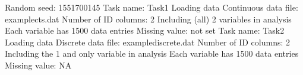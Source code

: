 \documentclass[letterpaper,10pt,english]{sphinxmanual}
\begin{document}
\begin{sphinxVerbatim}[commandchars=\\\{\}]
Random seed: 1551700145
\PYGZhy{}\PYGZhy{}\PYGZhy{}\PYGZhy{}\PYGZhy{}\PYGZhy{}\PYGZhy{}\PYGZhy{}\PYGZhy{}\PYGZhy{}\PYGZhy{}\PYGZhy{}\PYGZhy{}\PYGZhy{}\PYGZhy{}\PYGZhy{}\PYGZhy{}\PYGZhy{}\PYGZhy{}\PYGZhy{}\PYGZhy{}\PYGZhy{}\PYGZhy{}\PYGZhy{}\PYGZhy{}\PYGZhy{}\PYGZhy{}\PYGZhy{}\PYGZhy{}\PYGZhy{}\PYGZhy{}\PYGZhy{}\PYGZhy{}\PYGZhy{}\PYGZhy{}\PYGZhy{}\PYGZhy{}\PYGZhy{}\PYGZhy{}\PYGZhy{}\PYGZhy{}\PYGZhy{}\PYGZhy{}\PYGZhy{}\PYGZhy{}\PYGZhy{}\PYGZhy{}\PYGZhy{}\PYGZhy{}\PYGZhy{}
Task name: Task\PYGZhy{}1
Loading data
Continuous data file: example\PYGZhy{}cts.dat
Number of ID columns: 2
Including (all) 2 variables in analysis
Each variable has 1500 data entries
Missing value: not set
\PYGZhy{}\PYGZhy{}\PYGZhy{}\PYGZhy{}\PYGZhy{}\PYGZhy{}\PYGZhy{}\PYGZhy{}\PYGZhy{}\PYGZhy{}\PYGZhy{}\PYGZhy{}\PYGZhy{}\PYGZhy{}\PYGZhy{}\PYGZhy{}\PYGZhy{}\PYGZhy{}\PYGZhy{}\PYGZhy{}\PYGZhy{}\PYGZhy{}\PYGZhy{}\PYGZhy{}\PYGZhy{}\PYGZhy{}\PYGZhy{}\PYGZhy{}\PYGZhy{}\PYGZhy{}\PYGZhy{}\PYGZhy{}\PYGZhy{}\PYGZhy{}\PYGZhy{}\PYGZhy{}\PYGZhy{}\PYGZhy{}\PYGZhy{}\PYGZhy{}\PYGZhy{}\PYGZhy{}\PYGZhy{}\PYGZhy{}\PYGZhy{}\PYGZhy{}\PYGZhy{}\PYGZhy{}\PYGZhy{}\PYGZhy{}
\PYGZhy{}\PYGZhy{}\PYGZhy{}\PYGZhy{}\PYGZhy{}\PYGZhy{}\PYGZhy{}\PYGZhy{}\PYGZhy{}\PYGZhy{}\PYGZhy{}\PYGZhy{}\PYGZhy{}\PYGZhy{}\PYGZhy{}\PYGZhy{}\PYGZhy{}\PYGZhy{}\PYGZhy{}\PYGZhy{}\PYGZhy{}\PYGZhy{}\PYGZhy{}\PYGZhy{}\PYGZhy{}\PYGZhy{}\PYGZhy{}\PYGZhy{}\PYGZhy{}\PYGZhy{}\PYGZhy{}\PYGZhy{}\PYGZhy{}\PYGZhy{}\PYGZhy{}\PYGZhy{}\PYGZhy{}\PYGZhy{}\PYGZhy{}\PYGZhy{}\PYGZhy{}\PYGZhy{}\PYGZhy{}\PYGZhy{}\PYGZhy{}\PYGZhy{}\PYGZhy{}\PYGZhy{}\PYGZhy{}\PYGZhy{}
Task name: Task\PYGZhy{}2
Loading data
Discrete data file: example\PYGZhy{}discrete.dat
Number of ID columns: 2
Including the 1 and only variable in analysis
Each variable has 1500 data entries
Missing value: NA
\PYGZhy{}\PYGZhy{}\PYGZhy{}\PYGZhy{}\PYGZhy{}\PYGZhy{}\PYGZhy{}\PYGZhy{}\PYGZhy{}\PYGZhy{}\PYGZhy{}\PYGZhy{}\PYGZhy{}\PYGZhy{}\PYGZhy{}\PYGZhy{}\PYGZhy{}\PYGZhy{}\PYGZhy{}\PYGZhy{}\PYGZhy{}\PYGZhy{}\PYGZhy{}\PYGZhy{}\PYGZhy{}\PYGZhy{}\PYGZhy{}\PYGZhy{}\PYGZhy{}\PYGZhy{}\PYGZhy{}\PYGZhy{}\PYGZhy{}\PYGZhy{}\PYGZhy{}\PYGZhy{}\PYGZhy{}\PYGZhy{}\PYGZhy{}\PYGZhy{}\PYGZhy{}\PYGZhy{}\PYGZhy{}\PYGZhy{}\PYGZhy{}\PYGZhy{}\PYGZhy{}\PYGZhy{}\PYGZhy{}\PYGZhy{}
\PYGZhy{}\PYGZhy{}\PYGZhy{}\PYGZhy{}\PYGZhy{}\PYGZhy{}\PYGZhy{}\PYGZhy{}\PYGZhy{}\PYGZhy{}\PYGZhy{}\PYGZhy{}\PYGZhy{}\PYGZhy{}\PYGZhy{}\PYGZhy{}\PYGZhy{}\PYGZhy{}\PYGZhy{}\PYGZhy{}\PYGZhy{}\PYGZhy{}\PYGZhy{}\PYGZhy{}\PYGZhy{}\PYGZhy{}\PYGZhy{}\PYGZhy{}\PYGZhy{}\PYGZhy{}\PYGZhy{}\PYGZhy{}\PYGZhy{}\PYGZhy{}\PYGZhy{}\PYGZhy{}\PYGZhy{}\PYGZhy{}\PYGZhy{}\PYGZhy{}\PYGZhy{}\PYGZhy{}\PYGZhy{}\PYGZhy{}\PYGZhy{}\PYGZhy{}\PYGZhy{}\PYGZhy{}\PYGZhy{}\PYGZhy{}

\end{sphinxVerbatim}
\end{document}
